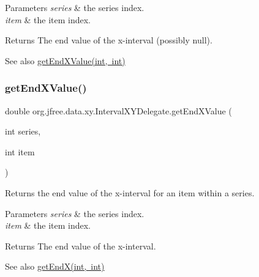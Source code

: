 \begin{DoxyParams}{Parameters}
{\em series} & the series index. \\
\hline
{\em item} & the item index.\\
\hline
\end{DoxyParams}
\begin{DoxyReturn}{Returns}
The end value of the x-\/interval (possibly {\ttfamily null}).
\end{DoxyReturn}
\begin{DoxySeeAlso}{See also}
\mbox{\hyperlink{classorg_1_1jfree_1_1data_1_1xy_1_1_interval_x_y_delegate_a1416edd956b9f807f023f38998421645}{get\+End\+X\+Value(int, int)}} 
\end{DoxySeeAlso}
\mbox{\label{classorg_1_1jfree_1_1data_1_1xy_1_1_interval_x_y_delegate_a1416edd956b9f807f023f38998421645}} 
\subsubsection{\texorpdfstring{get\+End\+X\+Value()}{getEndXValue()}}
{\footnotesize\ttfamily double org.\+jfree.\+data.\+xy.\+Interval\+X\+Y\+Delegate.\+get\+End\+X\+Value (\begin{DoxyParamCaption}\item[{int}]{series,  }\item[{int}]{item }\end{DoxyParamCaption})}

Returns the end value of the x-\/interval for an item within a series.


\begin{DoxyParams}{Parameters}
{\em series} & the series index. \\
\hline
{\em item} & the item index.\\
\hline
\end{DoxyParams}
\begin{DoxyReturn}{Returns}
The end value of the x-\/interval.
\end{DoxyReturn}
\begin{DoxySeeAlso}{See also}
\mbox{\hyperlink{classorg_1_1jfree_1_1data_1_1xy_1_1_interval_x_y_delegate_a46859c55956ba9f85cd82672eeb8c25d}{get\+End\+X(int, int)}} 
\end{DoxySeeAlso}
\mbox{\label{classorg_1_1jfree_1_1data_1_1xy_1_1_interval_x_y_delegate_afe7842c28dff0d018fa45072410c9662}} 

